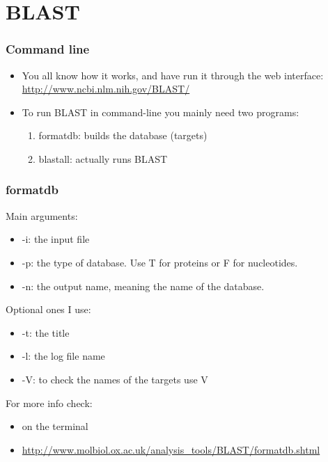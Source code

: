 \section{BLAST}
\begin{frame}[allowframebreaks]
  \frametitle{Command line}
  \begin{itemize}
  \item You all know how it works, and have run it through the web interface: \\ \url{http://www.ncbi.nlm.nih.gov/BLAST/}
  \item To run BLAST in command-line you mainly need two programs:
  \begin{enumerate}
  \item \alert{formatdb}: builds the database (targets)
  \item \alert{blastall}: actually runs BLAST
  \end{enumerate}
  \end{itemize}
\end{frame}

\begin{frame}[allowframebreaks]
  \frametitle{formatdb}
  Main arguments:
  \begin{itemize}
  \item \alert{-i}: the input file
  \item \alert{-p}: the type of database. Use \alert{T} for proteins or \alert{F} for nucleotides.
  \item \alert{-n}: the output name, meaning the name of the database.
  \end{itemize}
  Optional ones I use:
  \begin{itemize}
  \item \alert{-t}: the title
  \item \alert{-l}: the log file name
  \item \alert{-V}: to check the names of the targets use \alert{V}
  \end{itemize}
  For more info check:
  \begin{itemize}
  \item {} on the terminal
  \item \url{http://www.molbiol.ox.ac.uk/analysis_tools/BLAST/formatdb.shtml}
  \end{itemize}
\end{frame}

